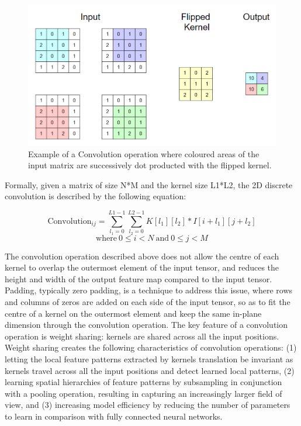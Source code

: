\begin{figure}[H]
  \centering
  \includegraphics[scale = 0.475]{Images/convolution.png}
  \caption{Example of a Convolution operation where coloured areas of the input matrix are successively dot producted with the flipped kernel.}
  \label{Convolution}
\end{figure}

Formally, given a matrix of size N*M and the kernel size L1*L2, the 2D discrete convolution is described by the following equation: 

\begin{equation}
  \text{Convolution}_{ij} = \sum_{l_1=0}^{L1-1} \sum_{l_2=0}^{L2-1} K[l_1][l_2]*I[i+l_1][j+l_2]
\end{equation}
$$\text{where} \ 0 \leq i < N \ \text{and} \ 0 \leq j < M$$ 

The convolution operation described above does not allow the centre of each kernel to overlap the outermost element of the input tensor, and reduces the height and width of the output feature map compared to the input tensor. Padding, typically zero padding, is a technique to address this issue, where rows and columns of zeros are added on each side of the input tensor, so as to fit the centre of a kernel on the outermost element and keep the same in-plane dimension through the convolution operation. The key feature of a convolution operation is weight sharing: kernels are shared across all the input positions. Weight sharing creates the following characteristics of convolution operations: (1) letting the local feature patterns extracted by kernels translation be invariant as kernels travel across all the input positions and detect learned local patterns, (2) learning spatial hierarchies of feature patterns by subsampling in conjunction with a pooling operation, resulting in capturing an increasingly larger field of view, and (3) increasing model efficiency by reducing the number of parameters to learn in comparison with fully connected neural networks. 


